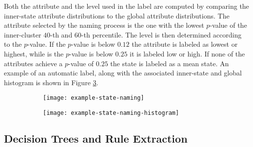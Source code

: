 Both the attribute and the level used in the label are computed by comparing the inner-state attribute
distributions to the global attribute distributions. The attribute selected by the naming process is
the one with the lowest $p$-value of the inner-cluster $40$-th and $60$-th percentile. The level is
then determined according to the $p$-value. If the $p$-value is below $0.12$ the attribute is labeled
as lowest or highest, while is the $p$-value is below $0.25$ it is labeled low or high. If none of the
attributes achieve a $p$-value of $0.25$ the state is labeled as a mean state. An example of an automatic
label, along with the associated inner-state and global histogram is shown in Figure \ref{fig:example-naming}.

\begin{figure}[h!]
	\centering
	\begin{subfigure}{.48\columnwidth}
	  	\centering
	  	\texttt{[image: example-state-naming]}
  		\caption{\label{fig:example-naming-label}}
	\end{subfigure}
	\begin{subfigure}{.48\columnwidth}
	  	\centering
	  	\texttt{[image: example-state-naming-histogram]}
	  	\caption{\label{fig:example-naming-histogram}}
	\end{subfigure}
	\caption{\lstopar{[TODO]}}
	\label{fig:example-naming}
\end{figure}

\iffalse
In order to assist the user in identifying the meaning of states, the system provides automatic default
state names, based on the distribution of attributes in the state. Each state is given a default name
by combining its most outstanding attribute with a discrete level: LOWEST, LOW, HIGH or
HIGHEST.

The attribute and the level are chosen by comparing its distribution inside the state to the global
distribution in all the states through histograms. This is achieved by first computing the percentiles
of the global distribution. The $40^{th}$ percentile is then computed for the state distribution and
compared against the global distribution. If this percentile lies below the $25^{th}$ or $12^{th}$
percentile, the state is marked with LOW or LOWEST respectively. The final name is chosen according
to the attribute which lies in the lowest percentile.
\fi

\subsection{Decision Trees and Rule Extraction}

